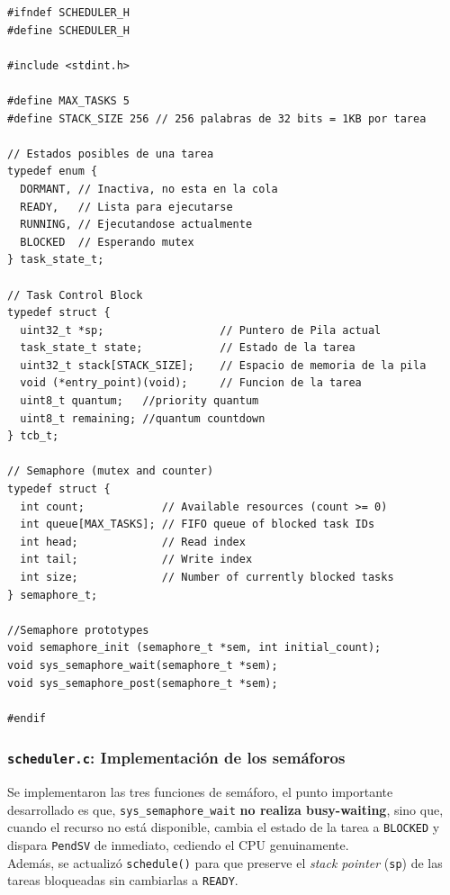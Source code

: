\documentclass[12pt,letterpaper]{article}
\begin{document}
\begin{lstlisting}[style=modernc, caption={\texttt{scheduler.h}, Estado \texttt{BLOCKED} y estructura \texttt{semaphore\_t}}]
#ifndef SCHEDULER_H
#define SCHEDULER_H

#include <stdint.h>

#define MAX_TASKS 5
#define STACK_SIZE 256 // 256 palabras de 32 bits = 1KB por tarea

// Estados posibles de una tarea
typedef enum {
  DORMANT, // Inactiva, no esta en la cola
  READY,   // Lista para ejecutarse
  RUNNING, // Ejecutandose actualmente
  BLOCKED  // Esperando mutex
} task_state_t;

// Task Control Block
typedef struct {
  uint32_t *sp;                  // Puntero de Pila actual
  task_state_t state;            // Estado de la tarea
  uint32_t stack[STACK_SIZE];    // Espacio de memoria de la pila
  void (*entry_point)(void);     // Funcion de la tarea
  uint8_t quantum;   //priority quantum
  uint8_t remaining; //quantum countdown
} tcb_t;

// Semaphore (mutex and counter)
typedef struct {
  int count;            // Available resources (count >= 0)
  int queue[MAX_TASKS]; // FIFO queue of blocked task IDs
  int head;             // Read index
  int tail;             // Write index
  int size;             // Number of currently blocked tasks
} semaphore_t;
 
//Semaphore prototypes
void semaphore_init (semaphore_t *sem, int initial_count);
void sys_semaphore_wait(semaphore_t *sem);
void sys_semaphore_post(semaphore_t *sem);

#endif
\end{lstlisting}

\subsubsection*{\texttt{scheduler.c}: Implementación de los semáforos}
Se implementaron las tres funciones de semáforo, el punto importante desarrollado es que, \texttt{sys\_semaphore\_wait} \textbf{no realiza busy-waiting}, sino que, cuando el recurso no está disponible, cambia el estado de la tarea a \texttt{BLOCKED} y dispara \texttt{PendSV} de inmediato, cediendo el CPU genuinamente.\\

Además, se actualizó \texttt{schedule()} para que preserve el \textit{stack pointer} (\texttt{sp}) de las tareas bloqueadas sin cambiarlas a \texttt{READY}.
\end{document}
